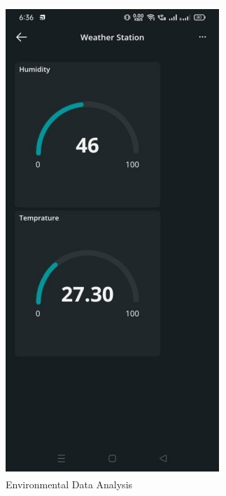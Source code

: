 \documentclass[12pt]{report}
\begin{document}
	\begin{figure}[ht]
		\centering
		\includegraphics[scale=1.4]{weatherstation.jpg}
		\caption[test_results]{Environmental Data Analysis}
		\label{test_results}
	\end{figure}
	\clearpage
	
\end{document}
